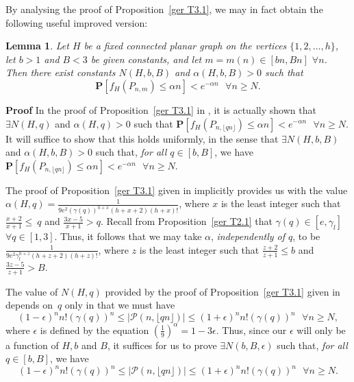 \documentclass{article}
\newtheorem{Lemma}[Theorem]{Lemma}
\newtheorem{Proof of Theorem}{Proof of Theorem}
\begin{document}
By analysing the proof of Proposition~\ref{ger T3.1}, we may in fact obtain the following useful improved version: 















\begin{Lemma} \label{gen2}
Let $H$ be a fixed connected planar graph on the vertices $\{1,2, \ldots ,h\}$,
let $b>1$ and $B<3$ be given constants,
and let $m=m(n) \in [bn,Bn]$ $\forall n$.
Then there exist constants $N(H,b,B)$ and $\alpha(H,b,B) >0$ such that
\begin{displaymath}
\mathbf{P}[f_{H}(P_{n,m}) \leq \alpha n] < e^{- \alpha n} \textrm{ } \forall n \geq N.
\end{displaymath}
\end{Lemma}
\textbf{Proof}
In the proof of Proposition~\ref{ger T3.1} in \cite{ger},
it is actually shown that $\exists N(H,q)$ and $\alpha (H,q) >0$ such that 
$\mathbf{P}[f_{H}(P_{n, \lfloor qn \rfloor}) \leq \alpha n] < e^{- \alpha n} \textrm{ } \forall n \geq N.$
It will suffice to show that this holds uniformly,
in the sense that $\exists N(H,b,B)$ and $\alpha(H,b,B)>0$
such that, \textit{for all $q \in [b,B]$},
we have
$\mathbf{P}[f_{H}(P_{n, \lfloor qn \rfloor}) \leq \alpha n] < e^{- \alpha n} \textrm{ } \forall n \geq N$.

The proof of Proposition~\ref{ger T3.1} given in \cite{ger} implicitly provides us with the value 
$\alpha (H,q) = \frac{1}{9e^{2}(\gamma (q))^{h+x}(h+x+2)(h+x)!}$,
where $x$ is the least integer such that 
$\frac{x+2}{x+1} \leq~q$ and $\frac{3x-5}{x+1} > q$.
Recall from Proposition~\ref{ger T2.1} 
that $\gamma (q) \in [e, \gamma_{l}]$~$\forall q \in [1,3]$.
Thus, it follows that we may take $\alpha$, \textit{independently of $q$}, 
to be $\frac{1}{9e^{2}\gamma_{l}^{h+z}(h+z+2)(h+z)!}$, 
where $z$ is the least integer such that $\frac{z+2}{z+1} \leq b$ and $\frac{3z-5}{z+1} > B$.

The value of $N(H,q)$ provided by the proof of Proposition~\ref{ger T3.1} given in \cite{ger} depends on~$q$ 
only in that we must have 
\begin{displaymath}
(1-\epsilon)^{n}n!(\gamma (q))^{n} \leq |\mathcal{P}(n, \lfloor qn \rfloor)| \leq 
(1+\epsilon)^{n}n!(\gamma (q))^{n} \textrm{ }\forall n \geq N,
\end{displaymath}
where $\epsilon$ is defined by the equation $\left( \frac{1}{9} \right)^{\alpha} = 1-3\epsilon$.
Thus, since our $\epsilon$ will only be a function of $H,b$ and $B$,
it suffices for us to prove $\exists N(b,B,\epsilon)$ such that, \emph{for all} $q \in [b,B]$, we have 
\begin{displaymath}
(1-\epsilon)^{n}n!(\gamma (q))^{n} \leq |\mathcal{P}(n, \lfloor qn \rfloor)| \leq 
(1+ \epsilon)^{n}n!(\gamma (q))^{n} \textrm{ }\forall n \geq N.
\end{displaymath}
\end{document}
